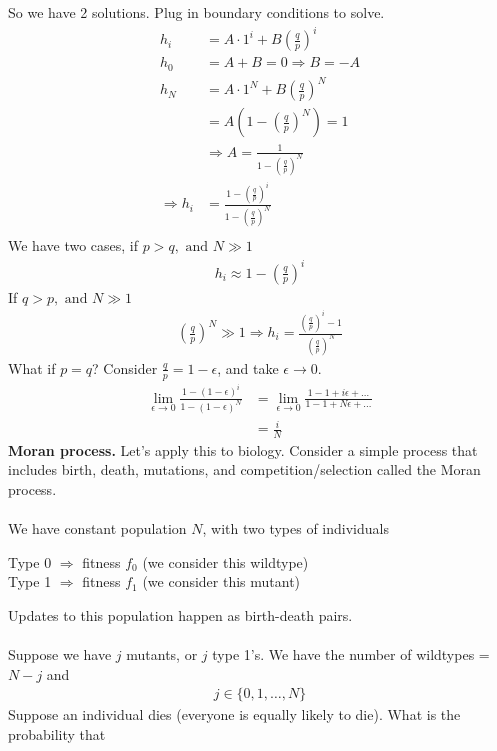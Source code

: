 \documentclass[12pt, letterpaper]{article}
\begin{document}
So we have 2 solutions. Plug in boundary conditions to solve.
\begin{align*}
    h_i &= A\cdot 1^i + B(\frac{q}{p})^i \\
    h_0 &= A + B = 0 \Rightarrow B = -A \\ 
    h_N &= A\cdot 1^N + B(\frac{q}{p})^N \\
    &= A(1-(\frac{q}{p})^N) = 1 \\
    &\Rightarrow A = \frac{1}{1-(\frac{q}{p})^N} \\
    \Rightarrow h_i &= \frac{1-(\frac{q}{p})^i}{1-(\frac{q}{p})^N} \\
\end{align*}
We have two cases, if $p > q,\text{ and } N \gg 1$
\begin{align*}
    h_i \approx 1 - (\frac{q}{p})^i
\end{align*}
If $q > p, \text{ and } N \gg 1$ 
\begin{align*}
    (\frac{q}{p})^N \gg 1 \Rightarrow h_i = \frac{(\frac{q}{p})^i-1}{(\frac{q}{p})^N}
\end{align*}
What if $p = q$? Consider $\frac{q}{p} = 1-\epsilon$, and take $\epsilon \rightarrow 0$.
\begin{align*}
    \lim_{\epsilon \rightarrow 0} \frac{1-(1-\epsilon)^i}{1-(1-\epsilon)^N} &= 
    \lim_{\epsilon \rightarrow 0} \frac{1-1+i\epsilon + \dots}{1-1 + N\epsilon + \dots} \\
    &= \frac{i}{N}
\end{align*}
\textbf{Moran process.} Let's apply this to biology. Consider a simple process that includes 
birth, death, mutations, and competition/selection called the Moran process. \\ \\
We have constant population $N$, with two types of individuals
\begin{center}
    Type 0 $\Rightarrow$ fitness $f_0$ (we consider this wildtype)\\
    Type 1 $\Rightarrow$ fitness $f_1$ (we consider this mutant)
\end{center}
Updates to this population happen as birth-death pairs. \\ \\
Suppose we have $j$ mutants, or $j$ type 1's. We have the number of wildtypes = $N-j$ and
\begin{align*}
    j \in \{0,1,\dots, N\}
\end{align*}
Suppose an individual dies (everyone is equally likely to die). What is the probability that 
\end{document}
